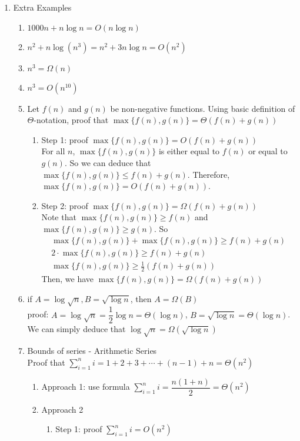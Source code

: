 \documentclass[11pt]{article}
\begin{document}
\begin{enumerate}
\item Extra Examples
\begin{enumerate}
\item $1000n + n \log n = O(n \log n)$
\item $n^2 + n \log (n^3) = n^2 + 3n \log n = O(n^2)$
\item $n ^3 = \Omega (n)$
\item $n^3 = O(n ^{10})$
\item Let $f(n)$ and $g(n)$ be non-negative functions. Using basic definition of $\Theta$-notation, proof that $\max\{f(n), g(n)\} = \Theta(f(n) + g(n))$
\begin{enumerate}
\item Step 1: proof $\max \{ f(n), g(n)\} = O(f(n) + g(n))$\\
For all $n$, $\max \{ f(n), g(n)\}$ is either equal to $f(n)$ or equal to $g(n)$. So we can deduce that $\max \{ f(n), g(n)\} \leq f(n) + g(n)$. Therefore, $\max \{ f(n), g(n)\} = O(f(n) + g(n))$.
\item Step 2: proof $\max \{ f(n), g(n)\} = \Omega(f(n) + g(n))$\\
Note that $\max \{ f(n), g(n)\} \geq f(n)$ and $\max \{ f(n), g(n)\} \geq g(n)$. So 
\begin{align*}
\max \{ f(n), g(n)\} + \max \{ f(n), g(n)\} \geq f(n) + g(n) \\
2\cdot \max \{ f(n), g(n)\} \geq f(n) + g(n)\\
\max \{ f(n), g(n)\} \geq \frac{1}{2} (f(n) + g(n))
\end{align*}
Then, we have $\max \{ f(n), g(n)\} = \Omega (f(n) + g(n))$
\end{enumerate}
\item if $A = \log \sqrt{n}, B = \sqrt{\log n}$, then $A = \Omega(B)$\\
proof: $A = \log \sqrt{n} = \dfrac{1}{2} \log n = \Theta(\log n)$, $B = \sqrt{\log n} = \Theta(\log n)$. We can simply deduce that $\log \sqrt{n} = \Omega(\sqrt{\log n})$
\item Bounds of series - Arithmetic Series\\
Proof that $\sum_{i=1}^{n} i = 1 +2 +3 + \cdots + (n-1) + n = \Theta (n^2)$
\begin{enumerate}
\item Approach 1: use formula $\sum_{i=1}^{n} i = \dfrac{n(1+n)}{2} = \Theta (n^2)$
\item Approach 2
\begin{enumerate}
\item Step 1: proof $\sum_{i=1}^{n} i = O(n^2)$

\end{enumerate}
\end{enumerate}
\end{enumerate}
\end{enumerate}
\end{document}
